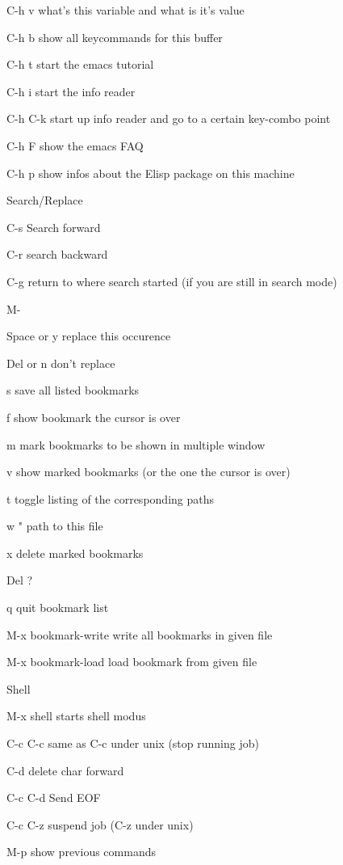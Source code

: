 \documentclass{article}
\begin{document}
C-h v what's this variable and what is it's value


C-h b show all keycommands for this buffer


C-h t start the emacs tutorial


C-h i start the info reader


C-h C-k start up info reader and go to a certain key-combo point


C-h F show the emacs FAQ


C-h p show infos about the Elisp package on this machine



Search/Replace


C-s Search forward


C-r search backward


C-g return to where search started (if you are still in search mode)


M-%


Space or y replace this occurence


Del or n don't replace



s save all listed bookmarks




f show bookmark the cursor is over


m mark bookmarks to be shown in multiple window


v show marked bookmarks (or the one the cursor is over)


t toggle listing of the corresponding paths


w " path to this file


x delete marked bookmarks


Del ?


q quit bookmark list




M-x bookmark-write write all bookmarks in given file


M-x bookmark-load load bookmark from given file



Shell


M-x shell starts shell modus


C-c C-c same as C-c under unix (stop running job)


C-d delete char forward


C-c C-d Send EOF


C-c C-z suspend job (C-z under unix)


M-p show previous commands
\end{document}
